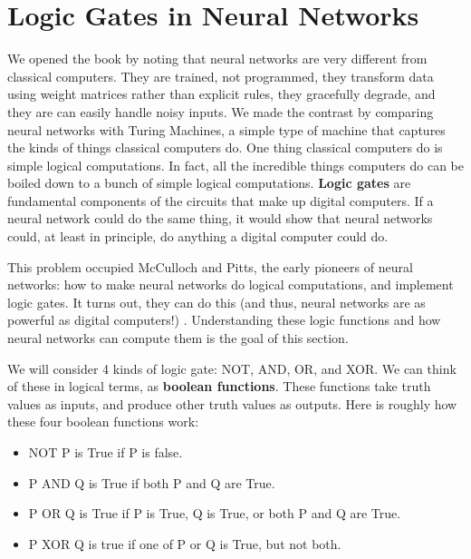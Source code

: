 \chapter{Logic Gates in Neural Networks}\label{ch_logicgates}


We opened the book by noting that neural networks are very different from classical computers. They are trained, not programmed, they transform data using weight matrices rather than explicit rules, they gracefully degrade, and they are can easily handle noisy inputs. We made the contrast by comparing neural networks with Turing Machines, a simple type of machine that captures the kinds of things classical computers do. One thing classical computers do is simple logical computations.  In fact, all the incredible things computers do can be boiled down to a bunch of simple logical computations. \textbf{Logic gates} are fundamental components of the circuits that make up digital computers. If a neural network could do the same thing, it would show that neural networks could, at least in principle, do anything a digital computer could do.

This problem occupied McCulloch and Pitts, the early pioneers of neural networks: how to make neural networks do logical computations, and implement logic gates. It turns out, they can do this  (and thus, neural networks are as powerful as digital computers!) \cite{mcculloch1943logical}. Understanding these logic functions and how neural networks can compute them is the goal of this section.

We will consider 4 kinds of logic gate: NOT, AND, OR, and XOR. We can think of these in logical terms, as \textbf{boolean functions}. These functions take truth values as inputs, and produce other truth values as outputs. Here is roughly how these four boolean functions work:

\begin{itemize}
\item NOT P is True if P is false.
\item P AND Q is True if both P and Q are True.
\item P OR Q is True if P is True, Q is True, or both P and Q are True.
\item P XOR Q is true if one of P or Q is True, but not both.
\end{itemize}

